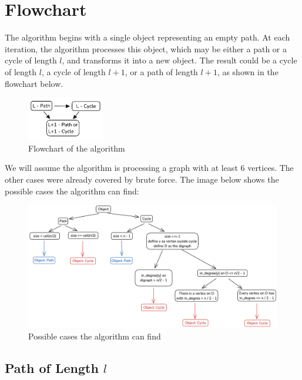 \section{Flowchart}

The algorithm begins with a single object representing an empty path. At 
each iteration, the algorithm processes this object, which may be either 
a path or a cycle of length $l$, and transforms it into a new object. 
The result could be a cycle of length $l$, a cycle of length $l+1$, or 
a path of length $l+1$, as shown in the flowchart below.

\begin{figure}[H]
    \centering
    \includegraphics[width=0.3\textwidth]{figuras/flowchart.png}
    \caption{Flowchart of the algorithm}
    \label{fig:flowchart}
\end{figure}

We will assume the algorithm is processing a graph with at
least $6$ vertices. The other cases were already covered by brute force.
The image below shows the possible cases the algorithm can find:

\begin{figure}[H]
    \centering
    \includegraphics[width=1\textwidth]{figuras/flowchart_case.png}
    \caption{Possible cases the algorithm can find}
    \label{fig:flowchart_cases}
\end{figure}

\subsection{Path of Length \( l \)}

